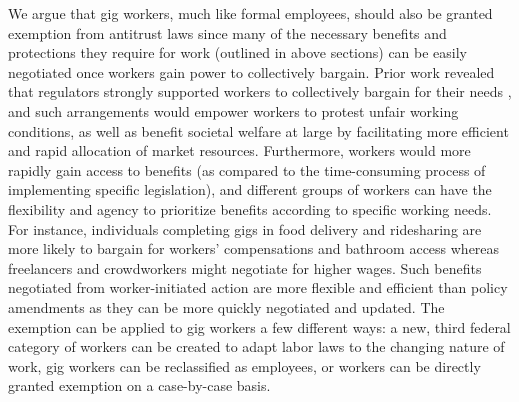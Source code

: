 We argue that gig workers, much like formal employees, should also be granted exemption from antitrust laws since many of the necessary benefits and protections they require for work (outlined in above sections) can be easily negotiated once workers gain power to collectively bargain. Prior work revealed that regulators strongly supported workers to collectively bargain for their needs \cite{Hsieh2023-cu}, and such arrangements would empower workers to protest unfair working conditions, as well as benefit societal welfare at large by facilitating more efficient and rapid allocation of market resources. Furthermore, workers would more rapidly gain access to benefits (as compared to the time-consuming process of implementing specific legislation), and different groups of workers can have the flexibility and agency to prioritize benefits according to specific working needs. For instance, individuals completing gigs in food delivery and ridesharing are more likely to bargain for workers' compensations and bathroom access whereas freelancers and crowdworkers might negotiate for higher wages. Such benefits negotiated from worker-initiated action are more flexible and efficient than policy amendments as they can be more quickly negotiated and updated. The exemption can be applied to gig workers a few different ways: a new, third federal category of workers can be created to adapt labor laws to the changing nature of work, gig workers can be reclassified as employees, or workers can be directly granted exemption on a case-by-case basis.

